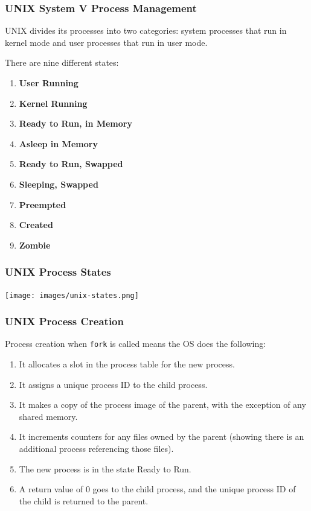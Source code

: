 \begin{frame}
\frametitle{UNIX System V Process Management}

UNIX divides its processes into two categories: system processes that run in kernel mode and user processes that run in user mode.

There are nine different states:

\begin{enumerate}
	\item \textbf{User Running}
	\item \textbf{Kernel Running}
	\item \textbf{Ready to Run, in Memory}
	\item \textbf{Asleep in Memory}
	\item \textbf{Ready to Run, Swapped}
	\item \textbf{Sleeping, Swapped}
	\item \textbf{Preempted}
	\item \textbf{Created}
	\item \textbf{Zombie}
\end{enumerate}


\end{frame}

\begin{frame}
\frametitle{UNIX Process States}

\begin{center}
\texttt{[image: images/unix-states.png]}
\end{center}

\end{frame}

\begin{frame}
\frametitle{UNIX Process Creation}

Process creation when \texttt{fork} is called means the OS does the following:

\begin{enumerate}
	\item It allocates a slot in the process table for the new process.
	\item It assigns a unique process ID to the child process.
	\item It makes a copy of the process image of the parent, with the exception of any shared memory.
	\item It increments counters for any files owned by the parent (showing there is an additional process referencing those files).
	\item The new process is in the state Ready to Run.
	\item A return value of 0 goes to the child process, and the unique process ID of the child is returned to the parent.
\end{enumerate}

\end{frame}

